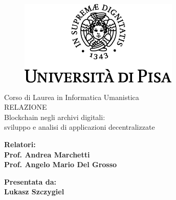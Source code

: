 \documentclass[12pt]{report}
\begin{document}
\begin{titlepage}
\begin{figure}
    \centering\includegraphics{logo}
\end{figure}

\begin{center}
    {\LARGE{ Corso di Laurea in Informatica Umanistica }}\\
    \vspace{2cm}
    {\Large { RELAZIONE }}\\
    \vspace{2cm}
    {\Large { Blockchain negli archivi digitali: \\ sviluppo e analisi di applicazioni decentralizzate }}
\end{center}

\vspace{36mm}

\begin{minipage}[t]{0.47\textwidth}
	{\large{\bf Relatori:\\ Prof. Andrea Marchetti\\ Prof. Angelo Mario Del Grosso}}
\end{minipage}\hfill\begin{minipage}[t]{0.47\textwidth}\raggedleft
	{\large{\bf Presentata da: \\ Lukasz Szczygiel\\ }}
\end{minipage}

\vspace{18mm}

\end{titlepage}

\tableofcontents

\listoffigures







\printbibliography
\end{document}

